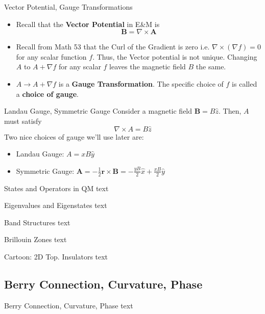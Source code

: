 \documentclass[12pt, aspectratio=169]{beamer}
\begin{document}
\begin{frame}{Vector Potential, Gauge Transformations}
    \begin{itemize}
        \item <1->{Recall that the \textbf{Vector Potential} in E\&M is $$\mathbf{B} = \nabla \times \mathbf{A}$$} 
        \item <2->{Recall from Math 53 that the Curl of the Gradient is zero i.e. $\nabla \times (\nabla f) = 0$ for any scalar function $f$. Thus, the Vector potential is not unique. Changing $A$ to $A + \nabla f$ for any scalar $f$ leaves the magnetic field $B$ the same.}
        \item <3->{$A \rightarrow A + \nabla f$ is a \textbf{Gauge Transformation}. The specific choice of $f$ is called a \textbf{choice of gauge}.}
    \end{itemize}
\end{frame}

\begin{frame}{Landau Gauge, Symmetric Gauge}
    Consider a magnetic field $\mathbf{B} = B\hat{z}$. Then, $A$ must satisfy $$ \nabla \times A = B \hat{z}$$ Two nice choices of gauge we'll use later are:
    \begin{itemize}
        \item Landau Gauge: $A = x B \hat{y}$
        \item Symmetric Gauge: $\mathbf{A} = -\frac{1}{2} \mathbf{r} \times \mathbf{B} = -\frac{yB}{2}\hat{x} + \frac{xB}{2} \hat{y}$  
    \end{itemize}
\end{frame}

\begin{frame}{States and Operators in QM}
    text
\end{frame}

\begin{frame}{Eigenvalues and Eigenstates}
    text
\end{frame}

\begin{frame}{Band Structures}
    text
\end{frame}

\begin{frame}{Brillouin Zones}
    text
\end{frame}


\begin{frame}{Cartoon: 2D Top. Insulators}
    text
\end{frame}


\subsection{Berry Connection, Curvature, Phase}
\begin{frame}{Berry Connection, Curvature, Phase}
    text
\end{frame}
\end{document}
